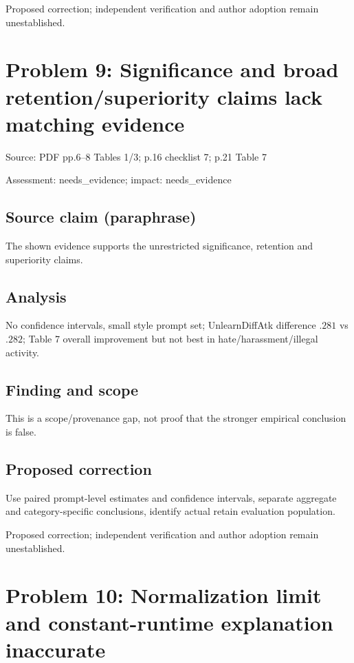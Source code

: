 \documentclass[11pt]{article}
\begin{document}
Proposed correction; independent verification and author adoption remain unestablished.

\section*{Problem 9: Significance and broad retention/superiority claims lack matching evidence}

Source: PDF pp.6–8 Tables 1/3; p.16 checklist 7; p.21 Table 7

Assessment: needs\_evidence; impact: needs\_evidence

\subsection*{Source claim (paraphrase)}

The shown evidence supports the unrestricted significance, retention and superiority claims.

\subsection*{Analysis}

No confidence intervals, small style prompt set; UnlearnDiffAtk difference \(.281\) vs \(.282\); Table 7 overall improvement but not best in hate/harassment/illegal activity.

\subsection*{Finding and scope}

This is a scope/provenance gap, not proof that the stronger empirical conclusion is false.

\subsection*{Proposed correction}

Use paired prompt-level estimates and confidence intervals, separate aggregate and category-specific conclusions, identify actual retain evaluation population.

Proposed correction; independent verification and author adoption remain unestablished.

\section*{Problem 10: Normalization limit and constant-runtime explanation inaccurate}
\end{document}
